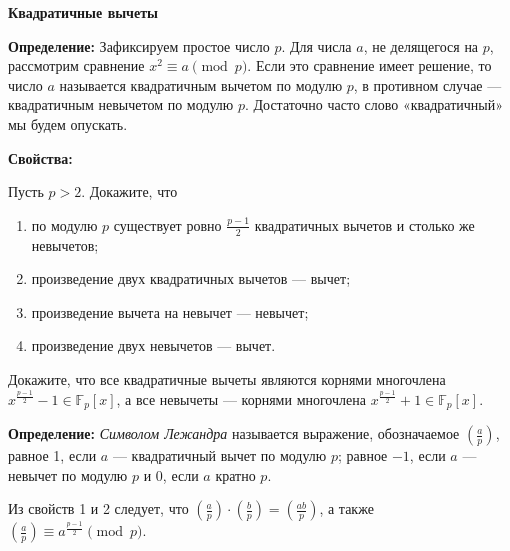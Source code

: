\documentclass{article}
\begin{document}
    \large

    \begin{center}
        \textbf{Квадратичные вычеты}
    \end{center}

    \textbf{Определение:}
    Зафиксируем простое число $p$.
    Для числа $a$, не делящегося на $p$, рассмотрим сравнение $x^2 \equiv a \pmod{p}$.
    Если это сравнение имеет решение, то число $a$ называется квадратичным вычетом по модулю $p$, в противном случае — квадратичным невычетом по модулю $p$.
    Достаточно часто слово «квадратичный» мы будем опускать.

    \textbf{Свойства:}

    \begin{enumerate_boxed}

        \item Пусть $p > 2$.
        Докажите, что

        \begin{enumerate}

            \item по модулю $p$ существует ровно $\frac{p-1}{2}$ квадратичных вычетов и столько же невычетов;

            \item произведение двух квадратичных вычетов — вычет;

            \item произведение вычета на невычет — невычет;

            \item произведение двух невычетов — вычет.

        \end{enumerate}

        \item Докажите, что все квадратичные вычеты являются корнями многочлена $x^{\frac{p-1}{2}} - 1 \in \mathbb{F}_p[x]$, а все невычеты — корнями многочлена $x^{\frac{p-1}{2}} + 1 \in \mathbb{F}_p[x]$.

    \end{enumerate_boxed}

    \textbf{Определение:} \textit{Символом Лежандра} называется выражение, обозначаемое $\left(\frac{a}{p}\right)$, равное 1, если $a$ — квадратичный вычет по модулю $p$; равное $-1$, если $a$ — невычет по модулю $p$ и 0, если $a$ кратно $p$.

    Из свойств 1 и 2 следует, что $\left(\frac{a}{p}\right) \cdot \left(\frac{b}{p}\right) = \left(\frac{ab}{p}\right)$, а также $\left(\frac{a}{p}\right) \equiv a^{\frac{p-1}{2}} \pmod{p}$.
\end{document}
